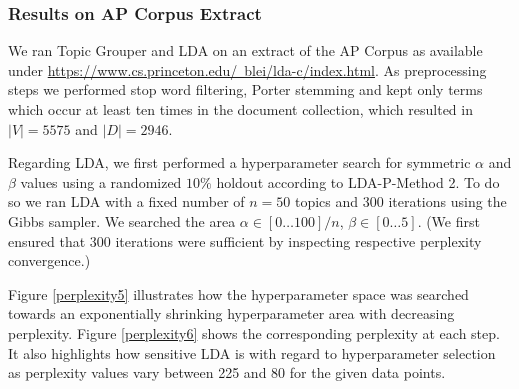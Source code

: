 \documentclass[10pt, a4paper, oneside]{article}
\begin{document}
\subsubsection{Results on AP Corpus Extract}
\label{apextractresults}

We ran Topic Grouper and LDA on an extract of the AP Corpus as available under \href{https://www.cs.princeton.edu/~blei/lda-c/index.html}{https://www.cs.princeton.edu/~blei/lda-c/index.html}. As preprocessing steps we performed stop word filtering, Porter stemming and kept only terms which occur at least ten times in the document collection, which resulted in $|V| = 5575$ and $|D| = 2946$.

Regarding LDA, we first performed a hyperparameter search for symmetric $\alpha$ and $\beta$ values using a randomized $10\%$ holdout according to
LDA-P-Method 2. To do so we ran LDA with a fixed number of $n = 50$ topics and 300 iterations using the Gibbs sampler. We searched the area $\alpha \in [0 \ldots 100] / n$, $\beta \in [0 \ldots 5]$. (We first ensured that 300 iterations were sufficient by inspecting respective perplexity convergence.)

Figure \ref{perplexity5} illustrates how the hyperparameter space was searched towards an exponentially shrinking hyperparameter area with decreasing perplexity.
Figure \ref{perplexity6} shows the corresponding perplexity at each step. It also highlights how sensitive LDA is with regard to hyperparameter selection as perplexity values vary between 225 and 80 for the given data points.
\end{document}
